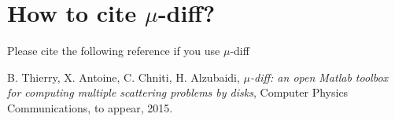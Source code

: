 \section*{How to cite $\mu$-diff?}

Please cite the following reference if you use $\mu$-diff

\medskip

B. Thierry, X. Antoine, C. Chniti, H. Alzubaidi, \textit{$\mu$-diff: an open Matlab toolbox for computing multiple scattering problems by disks},
Computer Physics Communications, to appear, 2015.



